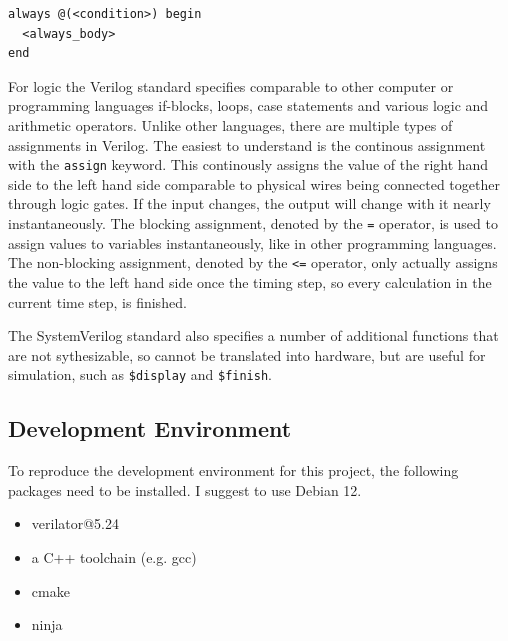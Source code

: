 \begin{lstlisting}
always @(<condition>) begin
  <always_body>
end

\end{lstlisting}

For logic the Verilog standard specifies comparable to other computer or programming languages if-blocks, loops, case statements and various logic and arithmetic operators. Unlike other languages, there are multiple types of assignments in Verilog. The easiest to understand is the continous assignment with the \texttt{assign} keyword. This continously assigns the value of the right hand side to the left hand side comparable to physical wires being connected together through logic gates. If the input changes, the output will change with it nearly instantaneously. The blocking assignment, denoted by the \texttt{=} operator, is used to assign values to variables instantaneously, like in other programming languages. The non-blocking assignment, denoted by the \texttt{<=} operator, only actually assigns the value to the left hand side once the timing step, so every calculation in the current time step, is finished. 

The SystemVerilog standard also specifies a number of additional functions that are not sythesizable, so cannot be translated into hardware, but are useful for simulation, such as \texttt{\$display} and \texttt{\$finish}.

\subsection{Development Environment}
To reproduce the development environment for this project, the following packages need to be installed. I suggest to use Debian 12. 

\begin{itemize}
  \item verilator@5.24
  \item a C++ toolchain (e.g. gcc)
  \item cmake
  \item ninja
\end{itemize}
  

